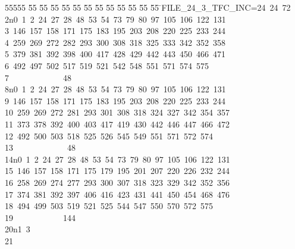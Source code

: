 %
%
\begin{tabbing}
55555 \= 55 \= 55 \= 55 \= 55 \= 55 \= 55 \= 55 \= 55 \= 55 \= 55 \= 55 \= 55 \= \>FILE\_24\_3\_TFC\_INC=24\ 24\ 72\\[0pt]
2\>n0\ 1\ 2\ 24\ 27\ 28\ 48\ 53\ 54\ 73\ 79\ 80\ 97\ 105\ 106\ 122\ 131\ \\[0pt]
3\ 146\ 157\ 158\ 171\ 175\ 183\ 195\ 203\ 208\ 220\ 225\ 233\ 244\ \\[0pt]
4\ 259\ 269\ 272\ 282\ 293\ 300\ 308\ 318\ 325\ 333\ 342\ 352\ 358\ \\[0pt]
5\ 379\ 381\ 392\ 398\ 400\ 417\ 428\ 429\ 442\ 443\ 450\ 466\ 471\ \\[0pt]
6\ 492\ 497\ 502\ 517\ 519\ 521\ 542\ 548\ 551\ 571\ 574\ 575\ \\[0pt]
7\>\ \ \ \ \ \ \ \ \ \ \ \ \ 48\\[0pt]
8\>n0\ 1\ 2\ 24\ 27\ 28\ 48\ 53\ 54\ 73\ 79\ 80\ 97\ 105\ 106\ 122\ 131\ \\[0pt]
9\ 146\ 157\ 158\ 171\ 175\ 183\ 195\ 203\ 208\ 220\ 225\ 233\ 244\ \\[0pt]
10\ 259\ 269\ 272\ 281\ 293\ 301\ 308\ 318\ 324\ 327\ 342\ 354\ 357\ \\[0pt]
11\ 373\ 378\ 392\ 400\ 403\ 417\ 419\ 430\ 442\ 446\ 447\ 466\ 472\ \\[0pt]
12\ 492\ 500\ 503\ 518\ 525\ 526\ 545\ 549\ 551\ 571\ 572\ 574\ \\[0pt]
13\>\ \ \ \ \ \ \ \ \ \ \ \ \ 48\\[0pt]
14\>n0\ 1\ 2\ 24\ 27\ 28\ 48\ 53\ 54\ 73\ 79\ 80\ 97\ 105\ 106\ 122\ 131\ \\[0pt]
15\ 146\ 157\ 158\ 171\ 175\ 179\ 195\ 201\ 207\ 220\ 226\ 232\ 244\ \\[0pt]
16\ 258\ 269\ 274\ 277\ 293\ 300\ 307\ 318\ 323\ 329\ 342\ 352\ 356\ \\[0pt]
17\ 374\ 381\ 392\ 397\ 406\ 416\ 423\ 431\ 441\ 450\ 454\ 468\ 476\ \\[0pt]
18\ 494\ 499\ 503\ 519\ 521\ 525\ 544\ 547\ 550\ 570\ 572\ 575\ \\[0pt]
19\>\ \ \ \ \ \ \ \ \ \ \ \ 144\\[0pt]
20\>n1\ 3\\[0pt]
21\>\end{tabbing}
